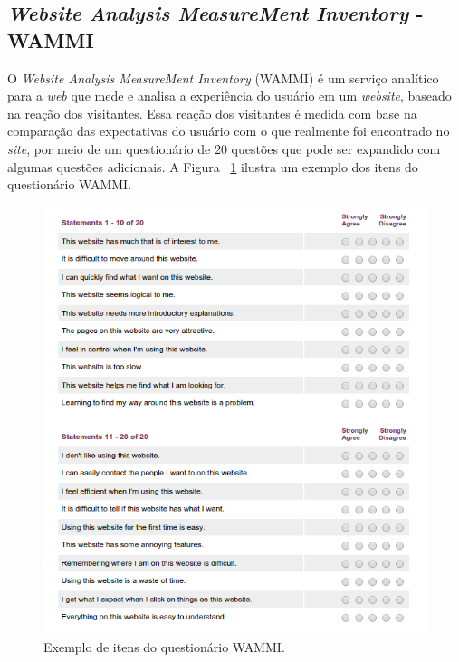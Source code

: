     \subsection{\textit{Website Analysis MeasureMent Inventory} - WAMMI}
      
      \nocite{wammi}
      O \textit{Website Analysis MeasureMent Inventory} (WAMMI) é um serviço analítico para a \textit{web} que mede e analisa a experiência do
      usuário em um \textit{website}, baseado na reação dos visitantes. Essa reação dos visitantes é medida com base na comparação das
      expectativas do usuário com o que realmente foi encontrado no \textit{site}, por meio de um questionário de 20 questões que pode
      ser expandido com algumas questões adicionais. A Figura ~\ref{wammi_questions} ilustra um exemplo dos itens do questionário WAMMI.
      
      \begin{figure}[!htpb]
	\centering
	\includegraphics[scale=0.67]{editaveis/figuras/wammi_questions}
	\caption[Exemplo de itens do questionário WAMMI]{Exemplo de itens do questionário WAMMI. \footnotemark}
	\label{wammi_questions}
      \end{figure}
      
